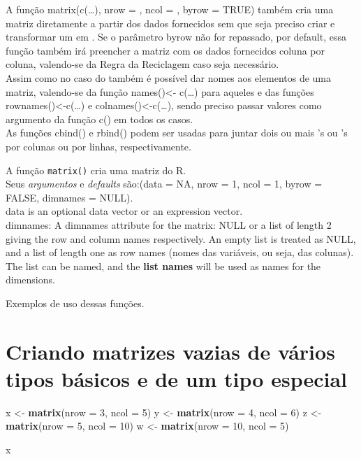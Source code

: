 \documentclass[]{article}
\newenvironment{Shaded}{\begin{snugshade}}{\end{snugshade}}
\newcommand{\KeywordTok}[1]{\textcolor[rgb]{0.13,0.29,0.53}{\textbf{#1}}}
\newcommand{\DataTypeTok}[1]{\textcolor[rgb]{0.13,0.29,0.53}{#1}}
\newcommand{\DecValTok}[1]{\textcolor[rgb]{0.00,0.00,0.81}{#1}}
\newcommand{\StringTok}[1]{\textcolor[rgb]{0.31,0.60,0.02}{#1}}
\newcommand{\NormalTok}[1]{#1}
\begin{document}
A função matrix(c(\ldots{}), nrow = , ncol = , byrow = TRUE) também cria
uma matriz diretamente a partir dos dados fornecidos sem que seja
preciso criar e transformar um em . Se o parâmetro byrow não for
repassado, por default, essa função também irá preencher a matriz com os
dados fornecidos coluna por coluna, valendo-se da Regra da Reciclagem
caso seja necessário.\\
Assim como no caso do também é possível dar nomes aos elementos de uma
matriz, valendo-se da função names()\textless{}- c(\ldots{}) para
aqueles e das funções rownames()\textless{}-c(\ldots{}) e
colnames()\textless{}-c(\ldots{}), sendo preciso passar valores como
argumento da função c() em todos os casos.\\
As funções cbind() e rbind() podem ser usadas para juntar dois ou mais
's ou 's por colunas ou por linhas, respectivamente.

A função \texttt{matrix()} cria uma matriz do R.\\
Seus \emph{argumentos} e \emph{defaults} são:(data = NA, nrow = 1, ncol
= 1, byrow = FALSE, dimnames = NULL).\\
data is an optional data vector or an expression vector.\\
dimnames: A dimnames attribute for the matrix: NULL or a list of length
2 giving the row and column names respectively. An empty list is treated
as NULL, and a list of length one as row names (nomes das variáveis, ou
seja, das colunas). The list can be named, and the \textbf{list names}
will be used as names for the dimensions.

Exemplos de uso dessas funções.

\section{Criando matrizes vazias de vários tipos básicos e de um tipo
especial}\label{criando-matrizes-vazias-de-varios-tipos-basicos-e-de-um-tipo-especial}

\begin{Shaded}
\begin{Highlighting}[]
\NormalTok{x <-}\StringTok{ }\KeywordTok{matrix}\NormalTok{(}\DataTypeTok{nrow =} \DecValTok{3}\NormalTok{, }\DataTypeTok{ncol =} \DecValTok{5}\NormalTok{)}
\NormalTok{y <-}\StringTok{ }\KeywordTok{matrix}\NormalTok{(}\DataTypeTok{nrow =} \DecValTok{4}\NormalTok{, }\DataTypeTok{ncol =} \DecValTok{6}\NormalTok{)}
\NormalTok{z <-}\StringTok{ }\KeywordTok{matrix}\NormalTok{(}\DataTypeTok{nrow =} \DecValTok{5}\NormalTok{, }\DataTypeTok{ncol =} \DecValTok{10}\NormalTok{)}
\NormalTok{w <-}\StringTok{ }\KeywordTok{matrix}\NormalTok{(}\DataTypeTok{nrow =} \DecValTok{10}\NormalTok{, }\DataTypeTok{ncol =} \DecValTok{5}\NormalTok{)}

\NormalTok{x}
\end{Highlighting}
\end{Shaded}
\end{document}
